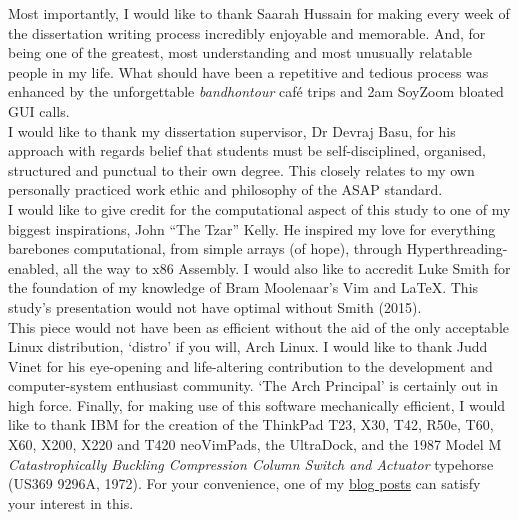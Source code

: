 \documentclass[11pt, english]{article}
\begin{document}
	Most importantly, I would like to thank Saarah Hussain for making every week of the dissertation writing process incredibly enjoyable and memorable. And, for being one of the greatest, most understanding and most unusually relatable people in my life. What should have been a repetitive and tedious process was enhanced by the unforgettable \textit{bandhontour} caf\'{e} trips and 2am SoyZoom bloated GUI calls.\\

I would like to thank my dissertation supervisor, Dr Devraj Basu, for his approach with regards belief that students must be self-disciplined, organised, structured and punctual to their own degree. This closely relates to my own personally practiced work ethic and philosophy of the ASAP standard.\\

I would like to give credit for the computational aspect of this study to one of my biggest inspirations, John ``The Tzar'' Kelly. He inspired my love for everything barebones computational, from simple arrays (of hope), through Hyperthreading-enabled, all the way to x86 Assembly. I would also like to accredit Luke Smith for the foundation of my knowledge of Bram Moolenaar’s Vim and {\LaTeX}. This study’s presentation would not have optimal without Smith (2015).\\

This piece would not have been as efficient without the aid of the only acceptable Linux distribution, `distro’ if you will, Arch Linux. I would like to thank Judd Vinet for his eye-opening and life-altering contribution to the development and computer-system enthusiast community. ‘The Arch Principal’ is certainly out in high force. Finally, for making use of this software mechanically efficient, I would like to thank IBM for the creation of the ThinkPad T23, X30, T42, R50e, T60, X60, X200, X220 and T420 neoVimPads, the UltraDock, and the 1987 Model M \textit{Catastrophically Buckling Compression Column Switch and Actuator} typehorse (US369 9296A, 1972). For your convenience, one of my \href{http://lewisbritton.com/Blog/ThinkFlow.html}{blog posts} can satisfy your interest in this. 
\end{document}
